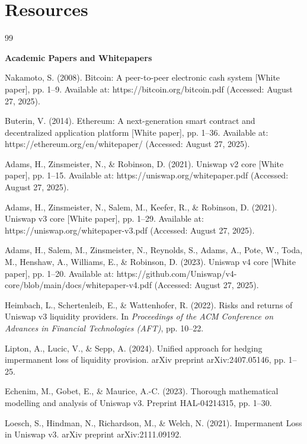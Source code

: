 \documentclass{article}
\begin{document}
\section{Resources}
\begin{thebibliography}{99}

\item[] \textbf{Academic Papers and Whitepapers}

Nakamoto, S. (2008). Bitcoin: A peer-to-peer electronic cash system [White paper], pp. 1--9. Available at: https://bitcoin.org/bitcoin.pdf (Accessed: August 27, 2025).

Buterin, V. (2014). Ethereum: A next-generation smart contract and decentralized application platform [White paper], pp. 1--36. Available at: https://ethereum.org/en/whitepaper/ (Accessed: August 27, 2025).

Adams, H., Zinsmeister, N., \& Robinson, D. (2021). Uniswap v2 core [White paper], pp. 1--15. Available at: https://uniswap.org/whitepaper.pdf (Accessed: August 27, 2025).

Adams, H., Zinsmeister, N., Salem, M., Keefer, R., \& Robinson, D. (2021). Uniswap v3 core [White paper], pp. 1--29. Available at: https://uniswap.org/whitepaper-v3.pdf (Accessed: August 27, 2025).

Adams, H., Salem, M., Zinsmeister, N., Reynolds, S., Adams, A., Pote, W., Toda, M., Henshaw, A., Williams, E., \& Robinson, D. (2023). Uniswap v4 core [White paper], pp. 1--20. Available at: https://github.com/Uniswap/v4-core/blob/main/docs/whitepaper-v4.pdf (Accessed: August 27, 2025).

Heimbach, L., Schertenleib, E., \& Wattenhofer, R. (2022). Risks and returns of Uniswap v3 liquidity providers. In \textit{Proceedings of the ACM Conference on Advances in Financial Technologies (AFT)}, pp. 10--22.

Lipton, A., Lucic, V., \& Sepp, A. (2024). Unified approach for hedging impermanent loss of liquidity provision. arXiv preprint arXiv:2407.05146, pp. 1--25.

Echenim, M., Gobet, E., \& Maurice, A.-C. (2023). Thorough mathematical modelling and analysis of Uniswap v3. Preprint HAL-04214315, pp. 1--30.

Loesch, S., Hindman, N., Richardson, M., \& Welch, N. (2021).
Impermanent Loss in Uniswap v3. arXiv preprint arXiv:2111.09192.


\end{thebibliography}
\end{document}
